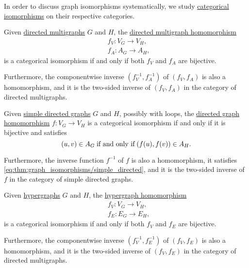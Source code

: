 \begin{proposition}\label{thm:graph_isomorphisms}
  In order to discuss graph isomorphisms systematically, we study \hyperref[def:morphism_invertibility/isomorphism]{categorical isomorphisms} on their respective categories.

  \begin{thmenum}
     Given \hyperref[def:directed_multigraph]{directed multigraphs} \( G \) and \( H \), the \hyperref[def:directed_multigraph/homomorphism]{directed multigraph homomorphism}
    \begin{align*}
      &f_V: V_G \to V_H, \\
      &f_A: A_G \to A_H,
    \end{align*}
    is a categorical isomorphism if and only if both \( f_V \) and \( f_A \) are bijective.

    Furthermore, the componentwise inverse \( (f_V^{-1}, f_A^{-1}) \) of \( (f_V, f_A) \) is also a homomorphism, and it is the two-sided inverse of \( (f_V, f_A) \) in the category of directed multigraphs.

     Given \hyperref[def:directed_graph]{simple directed graphs} \( G \) and \( H \), possibly with loops, the \hyperref[def:directed_graph/homomorphism]{directed graph homomorphism} \( f: V_G \to V_H \) is a categorical isomorphism if and only if it is bijective and satisfies
    \begin{equation}\label{eq:thm:graph_isomorphisms/simple_directed}
      (u, v) \in A_G \T{if and only if} (f(u), f(v)) \in A_H.
    \end{equation}

    Furthermore, the inverse function \( f^{-1} \) of \( f \) is also a homomorphism, it satisfies \eqref{eq:thm:graph_isomorphisms/simple_directed}, and it is the two-sided inverse of \( f \) in the category of simple directed graphs.

     Given \hyperref[def:hypergraph]{hypergraphs} \( G \) and \( H \), the \hyperref[def:hypergraph/homomorphism]{hypergraph homomorphism}
    \begin{align*}
      &f_V: V_G \to V_H, \\
      &f_E: E_G \to E_H,
    \end{align*}
    is a categorical isomorphism if and only if both \( f_V \) and \( f_E \) are bijective.

    Furthermore, the componentwise inverse \( (f_V^{-1}, f_E^{-1}) \) of \( (f_V, f_E) \) is also a homomorphism, and it is the two-sided inverse of \( (f_V, f_E) \) in the category of directed multigraphs.


\end{thmenum}
\end{proposition}
